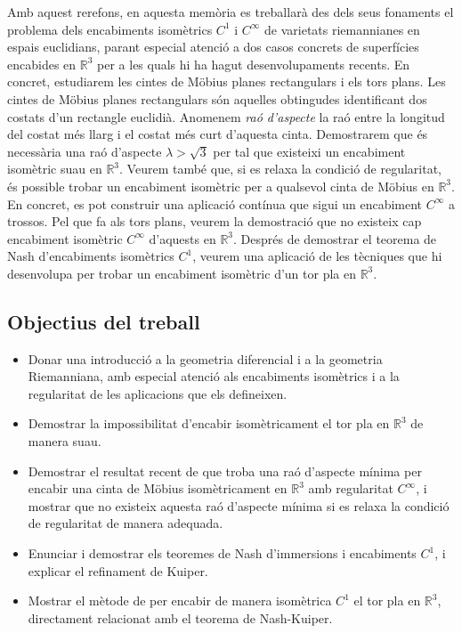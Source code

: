 Amb aquest rerefons, en aquesta memòria es treballarà des dels seus fonaments el problema dels encabiments isomètrics $C^1$ i $C^\infty$ de varietats riemannianes en espais euclidians, parant especial atenció a dos casos concrets de superfícies encabides en $\mathbb R^3$ per a les quals hi ha hagut desenvolupaments recents. En concret, estudiarem les cintes de Möbius planes rectangulars i els tors plans. Les cintes de Möbius planes rectangulars són aquelles obtingudes identificant dos costats d'un rectangle euclidià. Anomenem \textit{raó d'aspecte} la raó entre la longitud del costat més llarg i el costat més curt d'aquesta cinta. Demostrarem que és necessària una raó d'aspecte $\lambda>\sqrt3$ per tal que existeixi un encabiment isomètric suau en $\mathbb R^3$. 
Veurem també que, si es relaxa la condició de regularitat, és possible trobar un encabiment isomètric per a qualsevol cinta de Möbius en $\mathbb R^3$. En concret, es pot construir una aplicació contínua que sigui un encabiment $C^\infty$ a trossos. Pel que fa als tors plans, veurem la demostració que no existeix cap encabiment isomètric $C^\infty$ d'aquests en $\mathbb R^3$. Després de demostrar el teorema de Nash d'encabiments isomètrics $C^1$, veurem una aplicació de les tècniques que hi desenvolupa per trobar un encabiment isomètric d'un tor pla en $\mathbb R^3$.

\subsection*{Objectius del treball}
\begin{itemize}
    \item Donar una introducció a la geometria diferencial i a la geometria Riemanniana, amb especial atenció als encabiments isomètrics i a la regularitat de les aplicacions que els defineixen.
    \item Demostrar la impossibilitat d'encabir isomètricament el tor pla en $\mathbb R^3$ de manera suau.
    \item Demostrar el resultat recent de \cite{schwartz2024} que troba una raó d'aspecte mínima per encabir una cinta de Möbius isomètricament en $\mathbb R^3$ amb regularitat $C^\infty$, i mostrar que no existeix aquesta raó d'aspecte mínima si es relaxa la condició de regularitat de manera adequada.
    \item Enunciar i demostrar els teoremes de Nash d'immersions i encabiments $C^1$, i explicar el refinament de Kuiper.
    \item Mostrar el mètode de \cite{borrelli2013} per encabir de manera isomètrica $C^1$ el tor pla en $\mathbb R^3$, directament relacionat amb el teorema de Nash-Kuiper. 
\end{itemize}

